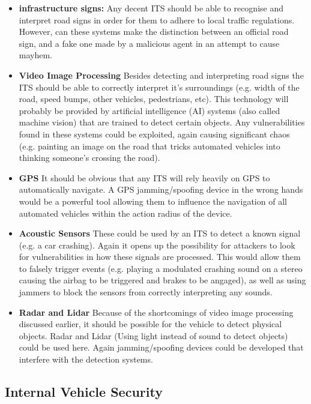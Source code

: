 \documentclass[master=cws,masteroption=vs,english]{kulemt}
\begin{document}
\begin{itemize}
	\item \textbf{infrastructure signs:} Any decent ITS should be able to recognise and interpret road signs in order for them to adhere to local traffic regulations. However, can these systems make the distinction between an official road sign, and a fake one made by a malicious agent in an attempt to cause mayhem.\cite{Petit}
	
	\item \textbf{Video Image Processing} Besides detecting and interpreting road signs the ITS should be able to correctly interpret it's surroundings (e.g. width of the road, speed bumps, other vehicles, pedestrians, etc). This technology will probably be provided by artificial intelligence (AI) systems (also called machine vision) that are trained to detect certain objects. Any vulnerabilities found in these systems could be exploited, again causing significant chaos (e.g. painting an image on the road that tricks automated vehicles into thinking someone's crossing the road).\cite{Petit}
	
	\item \textbf{GPS} It should be obvious that any ITS will rely heavily on GPS to automatically navigate. A GPS jamming/spoofing device in the wrong hands would be a powerful tool allowing them to influence the navigation of all automated vehicles within the action radius of the device.\cite{Petit}
	
	\item \textbf{Acoustic Sensors} These could be used by an ITS to detect a known signal (e.g. a car crashing). Again it opens up the possibility for attackers to look for vulnerabilities in how these signals are processed. This would allow them to falsely trigger events (e.g. playing a modulated crashing sound on a stereo causing the airbag to be triggered and brakes to be angaged), as well as using jammers to block the sensors from correctly interpreting any sounds.\cite{Petit}
	
	\item \textbf{Radar and Lidar} Because of the shortcomings of video image processing discussed earlier, it should be possible for the vehicle to detect physical objects. Radar and Lidar (Using light instead of sound to detect objects) could be used here. Again jamming/spoofing devices could be developed that interfere with the detection systems.\cite{Petit}
\end{itemize}

\subsection{Internal Vehicle Security}
\end{document}
